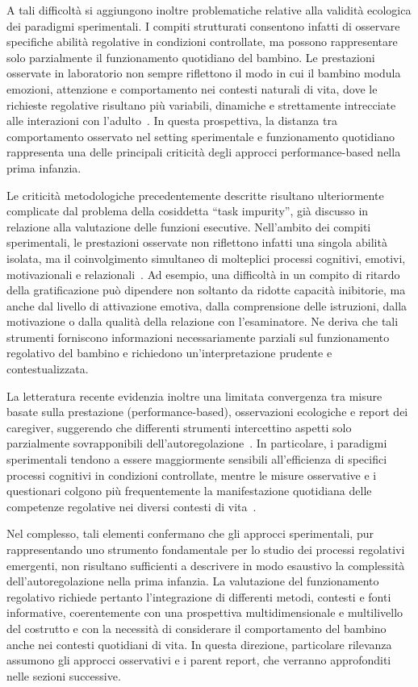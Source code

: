             A tali difficoltà si aggiungono inoltre problematiche relative alla validità ecologica dei paradigmi sperimentali. I compiti strutturati consentono infatti di osservare specifiche abilità regolative in condizioni controllate, ma possono rappresentare solo parzialmente il funzionamento quotidiano del bambino. Le prestazioni osservate in laboratorio non sempre riflettono il modo in cui il bambino modula emozioni, attenzione e comportamento nei contesti naturali di vita, dove le richieste regolative risultano più variabili, dinamiche e strettamente intrecciate alle interazioni con l'adulto~\cite{mcclelland2012}. In questa prospettiva, la distanza tra comportamento osservato nel setting sperimentale e funzionamento quotidiano rappresenta una delle principali criticità degli approcci performance-based nella prima infanzia.

            Le criticità metodologiche precedentemente descritte risultano ulteriormente complicate dal problema della cosiddetta ``task impurity'', già discusso in relazione alla valutazione delle funzioni esecutive. Nell'ambito dei compiti sperimentali, le prestazioni osservate non riflettono infatti una singola abilità isolata, ma il coinvolgimento simultaneo di molteplici processi cognitivi, emotivi, motivazionali e relazionali~\cite{miyake2012}. Ad esempio, una difficoltà in un compito di ritardo della gratificazione può dipendere non soltanto da ridotte capacità inibitorie, ma anche dal livello di attivazione emotiva, dalla comprensione delle istruzioni, dalla motivazione o dalla qualità della relazione con l'esaminatore. Ne deriva che tali strumenti forniscono informazioni necessariamente parziali sul funzionamento regolativo del bambino e richiedono un'interpretazione prudente e contestualizzata.

            La letteratura recente evidenzia inoltre una limitata convergenza tra misure basate sulla prestazione (performance-based), osservazioni ecologiche e report dei caregiver, suggerendo che differenti strumenti intercettino aspetti solo parzialmente sovrapponibili dell'autoregolazione~\cite{toplak2013,duckworth2011}. In particolare, i paradigmi sperimentali tendono a essere maggiormente sensibili all'efficienza di specifici processi cognitivi in condizioni controllate, mentre le misure osservative e i questionari colgono più frequentemente la manifestazione quotidiana delle competenze regolative nei diversi contesti di vita~\cite{berni2025}.

            Nel complesso, tali elementi confermano che gli approcci sperimentali, pur rappresentando uno strumento fondamentale per lo studio dei processi regolativi emergenti, non risultano sufficienti a descrivere in modo esaustivo la complessità dell'autoregolazione nella prima infanzia. La valutazione del funzionamento regolativo richiede pertanto l'integrazione di differenti metodi, contesti e fonti informative, coerentemente con una prospettiva multidimensionale e multilivello del costrutto e con la necessità di considerare il comportamento del bambino anche nei contesti quotidiani di vita. In questa direzione, particolare rilevanza assumono gli approcci osservativi e i parent report, che verranno approfonditi nelle sezioni successive.

